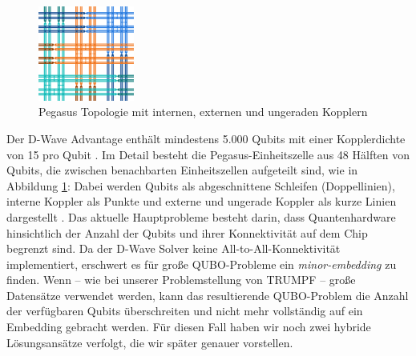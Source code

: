 \begin{figure}
  \centering
  \includegraphics[width=0.28\textwidth]{images/Pegasus.png}
  \caption{Pegasus Topologie mit internen, externen und ungeraden Kopplern}
  \label{fig:Pegasus}
\end{figure}
Der D-Wave Advantage enthält mindestens 5.000 Qubits mit einer Kopplerdichte von 15 pro Qubit \cite{Advantage2020}. Im Detail besteht die Pegasus-Einheitszelle aus 48 Hälften von Qubits, die zwischen benachbarten  Einheitszellen aufgeteilt sind, wie in Abbildung \ref{fig:Pegasus}: Dabei werden Qubits als abgeschnittene Schleifen (Doppellinien), interne Koppler als Punkte und externe und ungerade Koppler als kurze Linien dargestellt \cite{Pegasus2019}.
Das aktuelle Hauptprobleme besteht darin, dass Quantenhardware hinsichtlich der Anzahl der Qubits und ihrer Konnektivität auf dem Chip begrenzt sind. Da der D-Wave Solver keine All-to-All-Konnektivität implementiert, erschwert es für große QUBO-Probleme ein \textit{minor-embedding} zu finden.
Wenn -- wie bei unserer Problemstellung von TRUMPF -- große Datensätze verwendet werden, kann das resultierende QUBO-Problem die Anzahl der verfügbaren Qubits überschreiten und nicht mehr vollständig auf ein Embedding gebracht werden. Für diesen Fall haben wir noch zwei hybride Lösungsansätze verfolgt, die wir später genauer vorstellen.

\newpage

